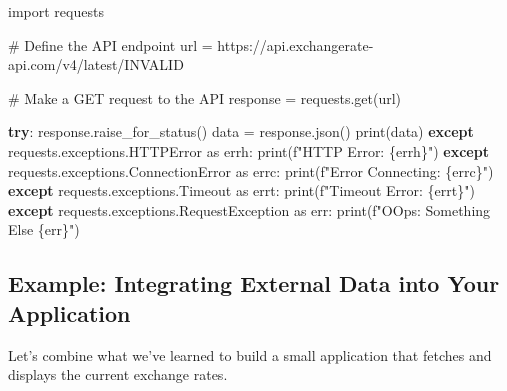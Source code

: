 \documentclass[
  letterpaper,
  DIV=11,
  numbers=noendperiod]{scrreprt}
\newenvironment{Shaded}{\begin{snugshade}}{\end{snugshade}}
\newcommand{\BuiltInTok}[1]{\textcolor[rgb]{0.00,0.23,0.31}{#1}}
\newcommand{\CommentTok}[1]{\textcolor[rgb]{0.37,0.37,0.37}{#1}}
\newcommand{\ControlFlowTok}[1]{\textcolor[rgb]{0.00,0.23,0.31}{\textbf{#1}}}
\newcommand{\ImportTok}[1]{\textcolor[rgb]{0.00,0.46,0.62}{#1}}
\newcommand{\NormalTok}[1]{\textcolor[rgb]{0.00,0.23,0.31}{#1}}
\newcommand{\OperatorTok}[1]{\textcolor[rgb]{0.37,0.37,0.37}{#1}}
\newcommand{\PreprocessorTok}[1]{\textcolor[rgb]{0.68,0.00,0.00}{#1}}
\newcommand{\SpecialCharTok}[1]{\textcolor[rgb]{0.37,0.37,0.37}{#1}}
\newcommand{\SpecialStringTok}[1]{\textcolor[rgb]{0.13,0.47,0.30}{#1}}
\newcommand{\StringTok}[1]{\textcolor[rgb]{0.13,0.47,0.30}{#1}}
\begin{document}
\begin{Shaded}
\begin{Highlighting}[]
\ImportTok{import}\NormalTok{ requests}

\CommentTok{\# Define the API endpoint}
\NormalTok{url }\OperatorTok{=} \StringTok{\textquotesingle{}https://api.exchangerate{-}api.com/v4/latest/INVALID\textquotesingle{}}

\CommentTok{\# Make a GET request to the API}
\NormalTok{response }\OperatorTok{=}\NormalTok{ requests.get(url)}

\ControlFlowTok{try}\NormalTok{:}
\NormalTok{    response.raise\_for\_status()}
\NormalTok{    data }\OperatorTok{=}\NormalTok{ response.json()}
    \BuiltInTok{print}\NormalTok{(data)}
\ControlFlowTok{except}\NormalTok{ requests.exceptions.HTTPError }\ImportTok{as}\NormalTok{ errh:}
    \BuiltInTok{print}\NormalTok{(}\SpecialStringTok{f"HTTP Error: }\SpecialCharTok{\{}\NormalTok{errh}\SpecialCharTok{\}}\SpecialStringTok{"}\NormalTok{)}
\ControlFlowTok{except}\NormalTok{ requests.exceptions.}\PreprocessorTok{ConnectionError} \ImportTok{as}\NormalTok{ errc:}
    \BuiltInTok{print}\NormalTok{(}\SpecialStringTok{f"Error Connecting: }\SpecialCharTok{\{}\NormalTok{errc}\SpecialCharTok{\}}\SpecialStringTok{"}\NormalTok{)}
\ControlFlowTok{except}\NormalTok{ requests.exceptions.Timeout }\ImportTok{as}\NormalTok{ errt:}
    \BuiltInTok{print}\NormalTok{(}\SpecialStringTok{f"Timeout Error: }\SpecialCharTok{\{}\NormalTok{errt}\SpecialCharTok{\}}\SpecialStringTok{"}\NormalTok{)}
\ControlFlowTok{except}\NormalTok{ requests.exceptions.RequestException }\ImportTok{as}\NormalTok{ err:}
    \BuiltInTok{print}\NormalTok{(}\SpecialStringTok{f"OOps: Something Else }\SpecialCharTok{\{}\NormalTok{err}\SpecialCharTok{\}}\SpecialStringTok{"}\NormalTok{)}
\end{Highlighting}
\end{Shaded}

\subsection{Example: Integrating External Data into Your
Application}\label{example-integrating-external-data-into-your-application}

Let's combine what we've learned to build a small application that
fetches and displays the current exchange rates.
\end{document}
